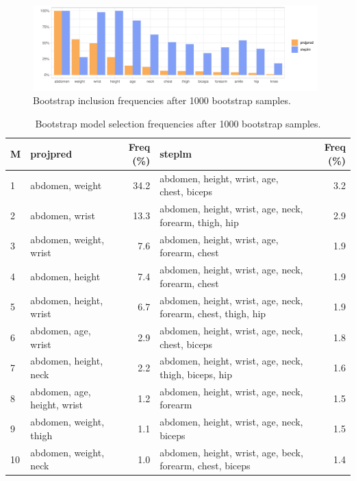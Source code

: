 \documentclass[american,]{article}
\theoremstyle{definition}
\begin{document}
\begin{figure}[tp]
  \centering
  \includegraphics[width=0.98\textwidth]{graphics/inc_prob.pdf}
  \caption{Bootstrap inclusion frequencies after 1000 bootstrap samples.}
  \label{fig:inclusion_frequencies}
\end{figure}


\begin{table}[tp]
\scriptsize
\centering
\begin{tabular}{l||l|r||l|r}
  \hline
M & projpred & Freq (\%) & steplm & Freq (\%)  \\ 
  \hline
1 & abdomen, weight & 34.2 & abdomen, height, wrist, age, chest, biceps & 3.2 \\
2 & abdomen, wrist & 13.3 & abdomen, height, wrist, age, neck, forearm, thigh, hip & 2.9 \\
3 & abdomen, weight, wrist & 7.6 & abdomen, height, wrist, age, forearm, chest & 1.9 \\
4 & abdomen, height & 7.4 & abdomen, height, wrist, age, neck, forearm, chest & 1.9 \\
5 & abdomen, height, wrist & 6.7 & abdomen, height, wrist, age, neck, forearm, chest, thigh, hip & 1.9 \\
6 & abdomen, age, wrist & 2.9 & abdomen, height, wrist, age, neck, chest, biceps & 1.8 \\
7 & abdomen, height, neck & 2.2 & abdomen, height, wrist, age, neck, thigh, biceps, hip & 1.6 \\
8 & abdomen, age, height, wrist & 1.2 & abdomen, height, wrist, age, neck, forearm & 1.5 \\
9 & abdomen, weight, thigh & 1.1 & abdomen, height, wrist, age, neck, biceps & 1.5 \\
10 & abdomen, weight, neck & 1.0 & abdomen, height, wrist, age, beck, forearm, chest, biceps & 1.4 \\
   \hline
\end{tabular}
\caption{Bootstrap model selection frequencies after 1000 bootstrap samples.}
\label{tab:model_frequencies}
\end{table}
\end{document}
